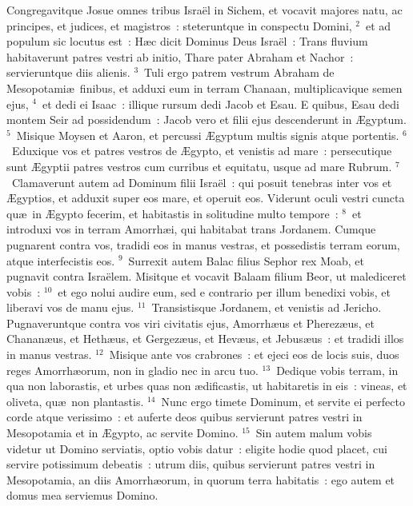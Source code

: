 \lettrine[lines=3,image=true,loversize=0.05,lraise=-0.03]{C}{}ongregavitque Josue omnes tribus Isra\"el in Sichem, et vocavit majores natu, ac principes, et judices, et magistros~: steteruntque in conspectu Domini,
${}^{2}$~et ad populum sic locutus est~: H\ae c dicit Dominus Deus Isra\"el~: Trans fluvium habitaverunt patres vestri ab initio, Thare pater Abraham et Nachor~: servieruntque diis alienis.
${}^{3}$~Tuli ergo patrem vestrum Abraham de Mesopotami\ae\ finibus, et adduxi eum in terram Chanaan, multiplicavique semen ejus,
${}^{4}$~et dedi ei Isaac~: illique rursum dedi Jacob et Esau. E quibus, Esau dedi montem Seir ad possidendum~: Jacob vero et filii ejus descenderunt in \AE gyptum.
${}^{5}$~Misique Moysen et Aaron, et percussi \AE gyptum multis signis atque portentis.
${}^{6}$~Eduxique vos et patres vestros de \AE gypto, et venistis ad mare~: persecutique sunt \AE gyptii patres vestros cum curribus et equitatu, usque ad mare Rubrum.
${}^{7}$~Clamaverunt autem ad Dominum filii Isra\"el~: qui posuit tenebras inter vos et \AE gyptios, et adduxit super eos mare, et operuit eos. Viderunt oculi vestri cuncta qu\ae\ in \AE gypto fecerim, et habitastis in solitudine multo tempore~:
${}^{8}$~et introduxi vos in terram Amorrh\ae i, qui habitabat trans Jordanem. Cumque pugnarent contra vos, tradidi eos in manus vestras, et possedistis terram eorum, atque interfecistis eos.
${}^{9}$~Surrexit autem Balac filius Sephor rex Moab, et pugnavit contra Isra\"elem. Misitque et vocavit Balaam filium Beor, ut malediceret vobis~:
${}^{10}$~et ego nolui audire eum, sed e contrario per illum benedixi vobis, et liberavi vos de manu ejus.
${}^{11}$~Transistisque Jordanem, et venistis ad Jericho. Pugnaveruntque contra vos viri civitatis ejus, Amorrh\ae us et Pherez\ae us, et Chanan\ae us, et Heth\ae us, et Gergez\ae us, et Hev\ae us, et Jebus\ae us~: et tradidi illos in manus vestras.
${}^{12}$~Misique ante vos crabrones~: et ejeci eos de locis suis, duos reges Amorrh\ae orum, non in gladio nec in arcu tuo.
${}^{13}$~Dedique vobis terram, in qua non laborastis, et urbes quas non \ae dificastis, ut habitaretis in eis~: vineas, et oliveta, qu\ae\ non plantastis.
${}^{14}$~Nunc ergo timete Dominum, et servite ei perfecto corde atque verissimo~: et auferte deos quibus servierunt patres vestri in Mesopotamia et in \AE gypto, ac servite Domino.
${}^{15}$~Sin autem malum vobis videtur ut Domino serviatis, optio vobis datur~: eligite hodie quod placet, cui servire potissimum debeatis~: utrum diis, quibus servierunt patres vestri in Mesopotamia, an diis Amorrh\ae orum, in quorum terra habitatis~: ego autem et domus mea serviemus Domino.



